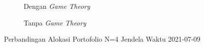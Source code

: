 %         
% 
% 
%         
% 
% 

\begin{figure}[!htbp]
    \centering
    \begin{subfigure}[b]{0.48\textwidth}
        \centering
        


        \caption{Dengan \textit{Game Theory}}
    \end{subfigure}
    \hfill
    \begin{subfigure}[b]{0.48\textwidth}
        \centering
        


        \caption{Tanpa \textit{Game Theory}}
    \end{subfigure}
    \caption{Perbandingan Alokasi Portofolio N=4 Jendela Waktu 2021-07-09}
    \label{fig:window_n4_2021_07_09}
\end{figure}

%         
% 
% 
%         
% 
% 

